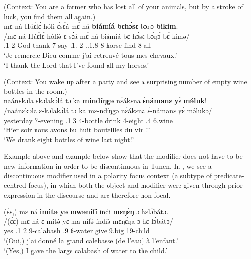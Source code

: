 \documentclass[output=paper,colorlinks,citecolor=brown
]{langscibook}
\begin{document}
\ea
(Context: You are a farmer who has lost all of your animals, but by a stroke of luck, you find them all again.) \\
\glll
{\db}mɛ ná Húɛ́lɛ́ hóli ɛ́\ds{}sɛ́á mɛ́ ná \textbf{biá\ds{}míá} \textbf{bɛhɔ́sɛ} bɔŋɔ \textbf{bikim}. \\
/mɛ ná Húɛ́lɛ́ hólíə́ ɛ-sɛ́á mɛ́ ná biámíá bɛ-hɔ́sɛ bɔ́ŋɔ́ bɛ́-kimə/ \\
{\db}\SM{}.1\SG{} \PST{}2{} God thank 7-say \SM{}.1\SG{}.\SBJV{} \PST{}2{} \POSS{}.\PRO{}.1\SG{}.8{} 8-horse find 8-all \\
\glt
`Je remercie Dieu comme j'ai retrouvé tous mes chevaux.' \\ `I thank the Lord that I've found all my horses.' \jambox*{[EE+EB 1827] }

\ex
(Context: You wake up after a party and see a surprising number of empty wine bottles in the room.) \\ 
\glll
{\db}naánɛkɔla ɛkɔlakɔ́lá tɔ ka \textbf{mindíŋgə} nɛ́ákɛna \textbf{ɛ́námanɛ} \textbf{yɛ́} \textbf{mə́luk}! \\
/naánɛkɔla ɛ-kɔlakɔ́lá tɔ ka mɛ-ndíŋgə nɛ́ákɛna ɛ́-námanɛ yɛ́ mə́lukə/ \\
{\db}yesterday 7-evening \SM{}.1\PL{} \PST{}3{} 4-bottle drink 4-eight \ASS{}.4 6.wine \\
\glt
`Hier soir nous avons bu huit bouteilles du vin !' \\  `We drank eight bottles of wine last night!' \jambox*{[JO 1941] }

\z

Example  above and example  below show that the modifier does not have to be new information in order to be discontinuous in Tunen. In , we see a discontinuous modifier used in a polarity focus context (a subtype of predicate-centred focus), in which both the object and modifier were given through prior expression in the discourse and are therefore non-focal.

\ea
\label{didgivecalabash}
\glll
{\db}(ɛ́ɛ,) mɛ ná \textbf{imitə} \textbf{yə} \textbf{mwənífí} indi \textbf{mɛŋɛ́ŋ} ɔ hɛlɔ́bátɔ. \\
/(ɛ́ɛ) mɛ ná ɛ-mítə́ yɛ ma-nífə́ índíə́ mɛŋɛ́ŋa ɔ hɛ-lɔ́bátɔ/ \\
{\db}yes \SM{}.1\SG{} \PST{}2{} 9-calabash \ASS{}.{}9 6-water give 9.big \PREP{} 19-child \\
\glt
`(Oui,) j'ai donné la grand calebasse (de l'eau) à l'enfant.' \\`(Yes,) I gave the large calabash of water to the child.' 
\end{document}
